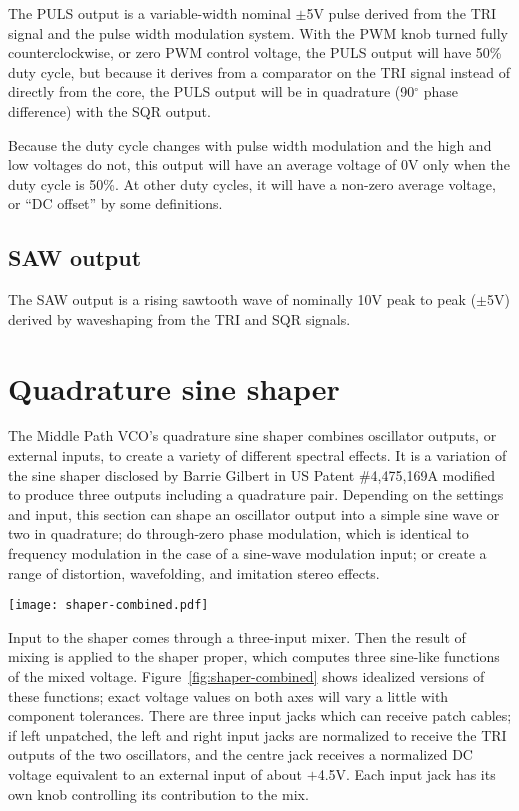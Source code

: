 The PULS output is a variable-width nominal $\pm$5V pulse derived from the
TRI signal and the pulse width modulation system.  With the PWM knob turned
fully counterclockwise, or zero PWM control voltage, the PULS output will
have 50\% duty cycle, but because it derives from a comparator on the TRI
signal instead of directly from the core, the PULS output will be in
quadrature (90$^\circ$ phase difference) with the SQR output.

Because the duty cycle changes with pulse width modulation and the high and
low voltages do not, this output will have an average voltage of 0V only
when the duty cycle is 50\%.  At other duty cycles, it will have a non-zero
average voltage, or ``DC offset'' by some definitions.

\subsection{SAW output}

The SAW output is a rising sawtooth wave of nominally 10V peak to peak
($\pm$5V) derived by waveshaping from the TRI and SQR signals.

\section{Quadrature sine shaper}

The Middle Path VCO's quadrature sine shaper combines oscillator outputs, or
external inputs, to create a variety of different spectral effects.  It is a
variation of the sine shaper disclosed by Barrie Gilbert in US Patent
\#4,475,169A modified to produce three outputs including a quadrature pair. 
Depending on the settings and input, this section can shape an oscillator
output into a simple sine wave or two in quadrature; do through-zero phase
modulation, which is identical to frequency modulation in the case of a
sine-wave modulation input; or create a range of distortion, wavefolding,
and imitation stereo effects.

\begin{figure*}[b]
{\centering\texttt{[image: shaper-combined.pdf]}\par}
\caption{Quadrature sine shaper voltage functions.}\label{fig:shaper-combined}
\end{figure*}

Input to the shaper comes through a three-input mixer.  Then the result of
mixing is applied to the shaper proper, which computes three sine-like
functions of the mixed voltage.  Figure~\ref{fig:shaper-combined} shows
idealized versions of these functions; exact voltage values on both axes
will vary a little with component tolerances.  There are three input jacks
which can receive patch cables; if left unpatched, the left and right input
jacks are normalized to receive the TRI outputs of the two oscillators, and
the centre jack receives a normalized DC voltage equivalent to an external
input of about $+$4.5V.  Each input jack has its own knob controlling its
contribution to the mix.

